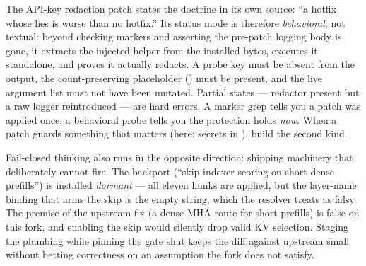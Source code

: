 \begin{hblesson}
The API-key redaction patch states the doctrine in its own source:
``a hotfix whose  lies is worse than no hotfix.'' Its status
mode is therefore \emph{behavioral}, not textual: beyond checking markers and
asserting the pre-patch logging body is gone, it extracts the injected helper
from the installed bytes, executes it standalone, and proves it actually
redacts. A probe key must be absent from the output, the count-preserving
placeholder () must be present, and the live
argument list must not have been mutated. Partial states --- redactor present
but a raw logger reintroduced --- are hard errors. A marker grep tells you a
patch was applied once; a behavioral probe tells you the protection holds
\emph{now}. When a patch guards something that matters (here: secrets in
), build the second kind.
\end{hblesson}

\begin{hbnote}
Fail-closed thinking also runs in the opposite direction: shipping machinery
that deliberately cannot fire. The  backport
(``skip indexer scoring on short dense prefills'') is installed
\emph{dormant} --- all eleven hunks are applied, but the layer-name binding
that arms the skip is the empty string, which the resolver treats as falsy.
The premise of the upstream fix (a dense-MHA route for short prefills) is
false on this fork, and enabling the skip would silently drop valid KV
selection. Staging the plumbing while pinning the gate shut keeps the diff
against upstream small without betting correctness on an assumption the fork
does not satisfy.
\end{hbnote}


